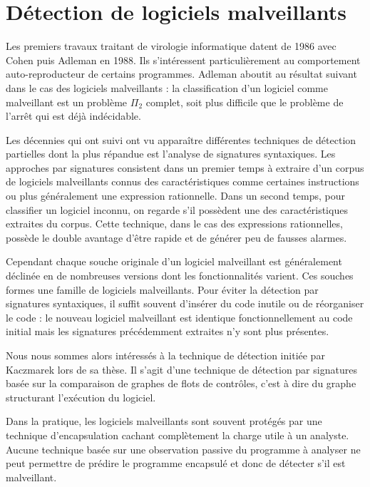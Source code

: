 \section{Détection de logiciels malveillants}
Les premiers travaux traitant de virologie informatique datent de 1986 avec Cohen \cite{Cohen86} puis Adleman \cite{Adleman88} en 1988. Ils s'intéressent particulièrement au comportement auto-reproducteur de certains programmes. Adleman  aboutit au résultat suivant dans le cas des logiciels malveillants : la classification d'un logiciel comme malveillant est un problème $\Pi_2$ complet, soit plus difficile que le problème de l'arrêt qui est déjà indécidable.

Les décennies qui ont suivi ont vu apparaître différentes techniques de détection partielles dont la plus répandue est l'analyse de signatures syntaxiques. Les approches par signatures consistent dans un premier temps à extraire d'un corpus de logiciels malveillants connus des caractéristiques comme certaines instructions ou plus généralement une expression rationnelle. Dans un second temps, pour classifier un logiciel inconnu, on regarde s'il possèdent une des caractéristiques extraites du corpus.
Cette technique, dans le cas des expressions rationnelles, possède le double avantage d'être rapide et de générer peu de fausses alarmes.

Cependant chaque souche originale d'un logiciel malveillant est généralement déclinée en de nombreuses versions dont les fonctionnalités varient. Ces souches formes une famille de logiciels malveillants. Pour éviter la détection par signatures syntaxiques, il suffit souvent d'insérer du code inutile ou de réorganiser le code : le nouveau logiciel malveillant est identique fonctionnellement au code initial mais les signatures précédemment extraites n'y sont plus présentes.

Nous nous sommes alors intéressés à la technique de détection initiée par Kaczmarek \cite{AThierry_BKM08} lors de sa thèse. Il s'agit d'une technique de détection par signatures basée sur la comparaison de graphes de flots de contrôles, c'est à dire du graphe structurant l'exécution du logiciel.

Dans la pratique, les logiciels malveillants sont souvent protégés par une technique d'encapsulation cachant complètement la charge utile à un analyste.
Aucune technique basée sur une observation passive du programme à analyser ne peut permettre de prédire le programme encapsulé et donc de détecter s'il est malveillant.

